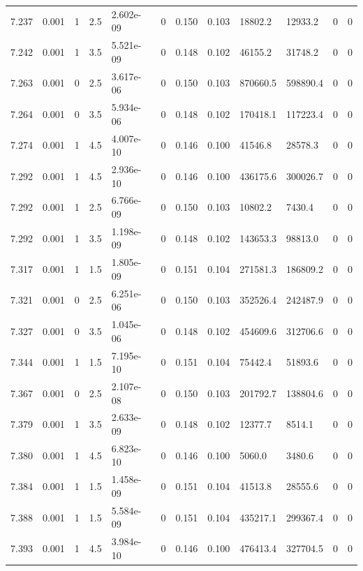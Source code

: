 \documentclass[preview]{standalone}
\begin{document}
{{{{{{{{{{{{{{{{{\begin{tabular}{L{1.2cm}C{1.2cm} C{0.3cm}C{0.5cm} C{1.4cm}C{1.4cm} C{1.4cm}C{1.4cm} C{1.6cm}C{1.6cm} C{1.6cm}C{1.6cm}}
  7.237  &  0.001  & 1     & 2.5 &  2.602e-09  & 0  &  0.150&   0.103& 18802.2 & 12933.2   &  0 & 0  \\ 
  7.242  &  0.001  & 1     & 3.5 &  5.521e-09  & 0  &  0.148&   0.102& 46155.2 & 31748.2   &  0 & 0  \\ 
  7.263  &  0.001  & 0     & 2.5 &  3.617e-06  & 0  &  0.150&   0.103& 870660.5 & 598890.4   &  0 & 0  \\ 
  7.264  &  0.001  & 0     & 3.5 &  5.934e-06  & 0  &  0.148&   0.102& 170418.1 & 117223.4   &  0 & 0  \\ 
  7.274  &  0.001  & 1     & 4.5 &  4.007e-10  & 0  &  0.146&   0.100& 41546.8 & 28578.3   &  0 & 0  \\ 
  7.292  &  0.001  & 1     & 4.5 &  2.936e-10  & 0  &  0.146&   0.100& 436175.6 & 300026.7   &  0 & 0  \\ 
  7.292  &  0.001  & 1     & 2.5 &  6.766e-09  & 0  &  0.150&   0.103& 10802.2 & 7430.4   &  0 & 0  \\ 
  7.292  &  0.001  & 1     & 3.5 &  1.198e-09  & 0  &  0.148&   0.102& 143653.3 & 98813.0   &  0 & 0  \\ 
  7.317  &  0.001  & 1     & 1.5 &  1.805e-09  & 0  &  0.151&   0.104& 271581.3 & 186809.2   &  0 & 0  \\ 
  7.321  &  0.001  & 0     & 2.5 &  6.251e-06  & 0  &  0.150&   0.103& 352526.4 & 242487.9   &  0 & 0  \\ 
  7.327  &  0.001  & 0     & 3.5 &  1.045e-06  & 0  &  0.148&   0.102& 454609.6 & 312706.6   &  0 & 0  \\ 
  7.344  &  0.001  & 1     & 1.5 &  7.195e-10  & 0  &  0.151&   0.104& 75442.4 & 51893.6   &  0 & 0  \\ 
  7.367  &  0.001  & 0     & 2.5 &  2.107e-08  & 0  &  0.150&   0.103& 201792.7 & 138804.6   &  0 & 0  \\ 
  7.379  &  0.001  & 1     & 3.5 &  2.633e-09  & 0  &  0.148&   0.102& 12377.7 & 8514.1   &  0 & 0  \\ 
  7.380  &  0.001  & 1     & 4.5 &  6.823e-10  & 0  &  0.146&   0.100& 5060.0 & 3480.6   &  0 & 0  \\ 
  7.384  &  0.001  & 1     & 1.5 &  1.458e-09  & 0  &  0.151&   0.104& 41513.8 & 28555.6   &  0 & 0  \\ 
  7.388  &  0.001  & 1     & 1.5 &  5.584e-09  & 0  &  0.151&   0.104& 435217.1 & 299367.4   &  0 & 0  \\ 
  7.393  &  0.001  & 1     & 4.5 &  3.984e-10  & 0  &  0.146&   0.100& 476413.4 & 327704.5   &  0 & 0  \\ 

\end{tabular}}}}}}}}}}}}}}}}}}
\end{document}
